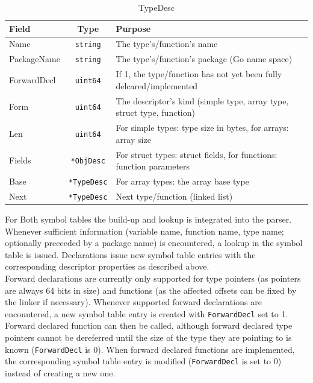\documentclass[a4paper]{scrartcl}
\begin{document}
      \begin{table}[htb]
      \centering
      \begin{tabular}{lc p{}}
        \toprule
        \textbf{Field} & \textbf{Type} & \textbf{Purpose}\\
        \midrule
        Name & \texttt{string} & The type's/function's name\\
        PackageName & \texttt{string} & The type's/function's package (Go name space)\\
        ForwardDecl & \texttt{uint64} & If 1, the type/function has not yet been fully delcared/implemented\\
        Form & \texttt{uint64} & The descriptor's kind (simple type, array type, struct type, function)\\
        Len & \texttt{uint64} & For simple types: type size in bytes, for arrays: array size\\
        Fields & \texttt{*ObjDesc} & For struct types: struct fields, for functions: function parameters\\
        Base & \texttt{*TypeDesc} & For array types: the array base type\\
        Next & \texttt{*TypeDesc} & Next type/function (linked list)\\
        \bottomrule
      \end{tabular}
      \caption{TypeDesc}
      \label{tbl:typedesc}
      \end{table}

    For Both symbol tables the build-up and lookup is integrated into the parser. Whenever sufficient information (variable name, function name, type name; optionally preceeded by a package name) is encountered, a lookup in the symbol table is issued. Declarations issue new symbol table entries with the corresponding descriptor properties as described above.\\
    Forward declarations are currently only supported for type pointers (as pointers are always 64 bits in size) and functions (as the affected offsets can be fixed by the linker if necessary). Whenever supported forward declarations are encountered, a new symbol table entry is created with \texttt{ForwardDecl} set to 1. Forward declared function can then be called, although forward declared type pointers cannot be dereferred until the size of the type they are pointing to is known (\texttt{ForwardDecl} is 0). When forward declared functions are implemented, the corresponding symbol table entry is modified (\texttt{ForwardDecl} is set to 0) instead of creating a new one.
      
\end{document}
